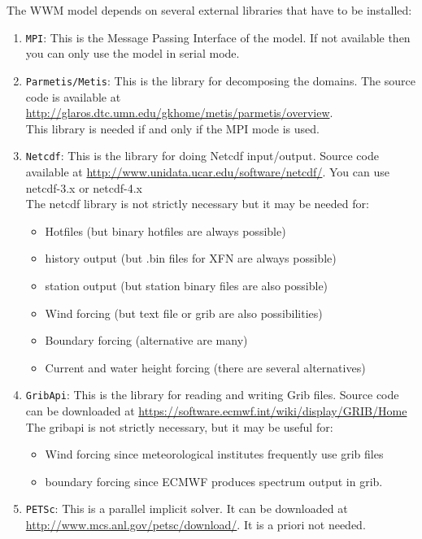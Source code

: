 \documentclass[12pt]{amsart}
\begin{document}
The WWM model depends on several external libraries that have to be installed:
\begin{enumerate}
\item {\tt MPI}: This is the Message Passing Interface of the model. If not available
  then you can only use the model in serial mode.
\item {\tt Parmetis/Metis}: This is the library for decomposing the domains. The source
  code is available at \url{http://glaros.dtc.umn.edu/gkhome/metis/parmetis/overview}.\\
This library is needed if and only if the MPI mode is used.
\item {\tt Netcdf}: This is the library for doing Netcdf input/output. Source code available at
  \url{http://www.unidata.ucar.edu/software/netcdf/}. You can use netcdf-3.x or netcdf-4.x\\
The netcdf library is not strictly necessary but it may be needed for:
\begin{itemize}
\item Hotfiles (but binary hotfiles are always possible)
\item history output (but .bin files for XFN are always possible)
\item station output (but station binary files are also possible)
\item Wind forcing (but text file or grib are also possibilities)
\item Boundary forcing (alternative are many)
\item Current and water height forcing (there are several alternatives)  
\end{itemize}
\item {\tt GribApi}: This is the library for reading and writing Grib files. Source code
  can be downloaded at \url{https://software.ecmwf.int/wiki/display/GRIB/Home}\\
The gribapi is not strictly necessary, but it may be useful for:
\begin{itemize}
\item Wind forcing since meteorological institutes frequently use grib files
\item boundary forcing since ECMWF produces spectrum output in grib.
\end{itemize}
\item {\tt PETSc}: This is a parallel implicit solver. It can be downloaded
  at \url{http://www.mcs.anl.gov/petsc/download/}. It is a priori not needed.
\end{enumerate}
\end{document}
